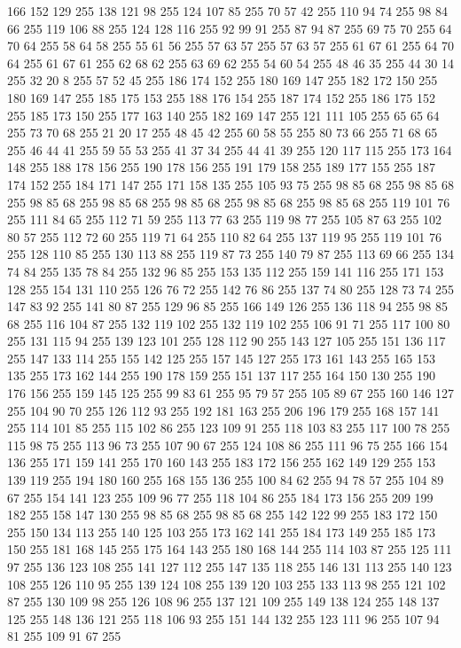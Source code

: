 166 152 129 255 138 121 98 255 124 107 85 255 70 57 42 255 110 94 74 255 98 84 66 255 119 106 88 255 124 128 116 255 92 99 91 255 87 94 87 255 69 75 70 255 64 70 64 255 58 64 58 255 55 61 56 255 57 63 57 255 57 63 57 255 61 67 61 255 64 70 64 255 61 67 61 255 62 68 62 255 63 69 62 255 54 60 54 255 48 46 35 255 44 30 14 255 32 20 8 255 57 52 45 255 186 174 152 255 180 169 147 255 182 172 150 255 180 169 147 255 185 175 153 255 188 176 154 255 187 174 152 255 186 175 152 255 185 173 150 255 177 163 140 255 182 169 147 255 121 111 105 255 65 65 64 255 73 70 68 255 21 20 17 255 48 45 42 255 60 58 55 255 80 73 66 255 71 68 65 255 46 44 41 255 59 55 53 255 41 37 34 255 44 41 39 255 120 117 115 255 173 164 148 255 188 178 156 255 190 178 156 255 191 179 158 255 189 177 155 255 187 174 152 255 184 171 147 255 171 158 135 255 105 93 75 255 98 85 68 255 98 85 68 255 98 85 68 255 98 85 68 255 98 85 68 255
98 85 68 255 98 85 68 255 119 101 76 255 111 84 65 255 112 71 59 255 113 77 63 255 119 98 77 255 105 87 63 255 102 80 57 255 112 72 60 255 119 71 64 255 110 82 64 255 137 119 95 255 119 101 76 255 128 110 85 255 130 113 88 255 119 87 73 255 140 79 87 255 113 69 66 255 134 74 84 255 135 78 84 255 132 96 85 255 153 135 112 255 159 141 116 255 171 153 128 255 154 131 110 255 126 76 72 255 142 76 86 255 137 74 80 255 128 73 74 255 147 83 92 255 141 80 87 255 129 96 85 255 166 149 126 255 136 118 94 255 98 85 68 255 116 104 87 255 132 119 102 255 132 119 102 255 106 91 71 255 117 100 80 255 131 115 94 255 139 123 101 255 128 112 90 255 143 127 105 255 151 136 117 255 147 133 114 255 155 142 125 255 157 145 127 255 173 161 143 255 165 153 135 255 173 162 144 255 190 178 159 255 151 137 117 255 164 150 130 255 190 176 156 255 159 145 125 255 99 83 61 255 95 79 57 255 105 89 67 255 160 146 127 255 104 90 70 255 126 112 93 255 192 181 163 255
206 196 179 255 168 157 141 255 114 101 85 255 115 102 86 255 123 109 91 255 118 103 83 255 117 100 78 255 115 98 75 255 113 96 73 255 107 90 67 255 124 108 86 255 111 96 75 255 166 154 136 255 171 159 141 255 170 160 143 255 183 172 156 255 162 149 129 255 153 139 119 255 194 180 160 255 168 155 136 255 100 84 62 255 94 78 57 255 104 89 67 255 154 141 123 255 109 96 77 255 118 104 86 255 184 173 156 255 209 199 182 255 158 147 130 255 98 85 68 255 98 85 68 255 142 122 99 255 183 172 150 255 150 134 113 255 140 125 103 255 173 162 141 255 184 173 149 255 185 173 150 255 181 168 145 255 175 164 143 255 180 168 144 255 114 103 87 255 125 111 97 255 136 123 108 255 141 127 112 255 147 135 118 255 146 131 113 255 140 123 108 255 126 110 95 255 139 124 108 255 139 120 103 255 133 113 98 255 121 102 87 255 130 109 98 255 126 108 96 255 137 121 109 255 149 138 124 255 148 137 125 255 148 136 121 255 118 106 93 255 151 144 132 255 123 111 96 255 107 94 81 255 109 91 67 255
